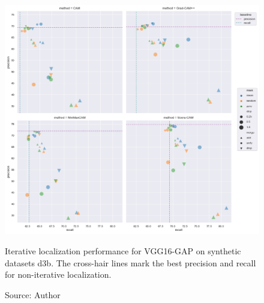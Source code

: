 \begin{figure}[ht]
    \begin{center}       
    \includegraphics[width=1.0\textwidth]{images/fig_iter_vgg16_gap_syn_d3b.png}
    \caption[Iterative localization performance for VGG16-GAP on synthetic dataset d3b]{Iterative localization performance for VGG16-GAP on synthetic datasets d3b. The cross-hair lines mark the best precision and recall for non-iterative localization.}
    \caption*{Source: Author}
    \label{fig:prec_iter_vgg16_gap_syn_d3b}
    \end{center}
\end{figure}

